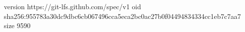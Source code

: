 version https://git-lfs.github.com/spec/v1
oid sha256:955783a30dc9dbc6cb067496cca5eca2bc0ac27b0f04494834334cc1eb7c7aa7
size 9590
